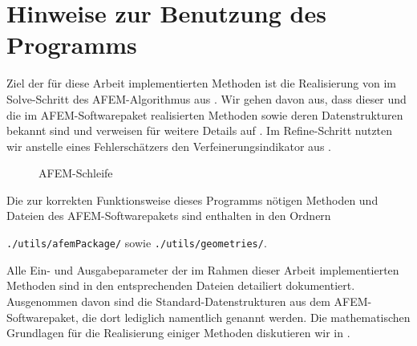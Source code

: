 
\section{Hinweise zur Benutzung des Programms}
Ziel der für diese Arbeit implementierten Methoden ist die Realisierung von
 im Solve-Schritt des AFEM-Algorithmus aus
. 
Wir gehen davon aus, dass dieser und die im
AFEM-Softwarepaket realisierten Methoden sowie deren Datenstrukturen bekannt
sind und verweisen für weitere Details auf \cite{CGKNRR10}. 
Im Refine-Schritt nutzten wir anstelle eines Fehlerschätzers den
Verfeinerungsindikator aus .

\begin{figure}[h]
  \centering
  
  \caption{AFEM-Schleife}
  \label{fig:afemLoop}
\end{figure}

Die zur korrekten Funktionsweise dieses Programms nötigen Methoden und
Dateien des AFEM-Softwarepakets sind enthalten in den Ordnern
\begin{center}
    \texttt{./utils/afemPackage/} sowie \texttt{./utils/geometries/}.
\end{center}

Alle Ein- und Ausgabeparameter der im Rahmen dieser Arbeit implementierten
Methoden sind in den entsprechenden Dateien detailiert dokumentiert. 
Ausgenommen davon sind die Standard-Datenstrukturen aus dem AFEM-Softwarepaket,
die dort lediglich namentlich genannt werden.
Die mathematischen Grundlagen für die Realisierung einiger Methoden diskutieren
wir in .

